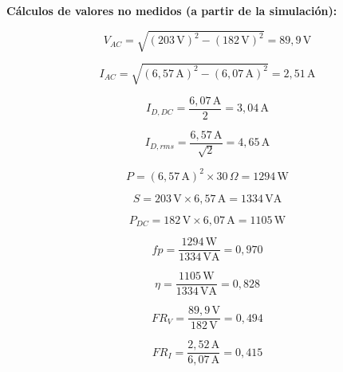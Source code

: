 \documentclass[12pt,a4paper]{article}
\begin{document}
\textbf{Cálculos de valores no medidos (a partir de la simulación):}

\begin{equation}
    V_{AC} = \sqrt{(203\,\text{V})^2 - (182\,\text{V})^2} = 89{,}9\,\text{V}
\end{equation}

\begin{equation}
    I_{AC} = \sqrt{(6{,}57\,\text{A})^2 - (6{,}07\,\text{A})^2} = 2{,}51\,\text{A}
\end{equation}

\begin{equation}
    I_{D,DC} = \frac{6{,}07\,\text{A}}{2} = 3{,}04\,\text{A}
\end{equation}

\begin{equation}
    I_{D,rms} = \frac{6{,}57\,\text{A}}{\sqrt{2}} = 4{,}65\,\text{A}
\end{equation}

\begin{equation}
    P = (6{,}57\,\text{A})^2 \times 30\,\Omega = 1294\,\text{W}
\end{equation}

\begin{equation}
    S = 203\,\text{V} \times 6{,}57\,\text{A} = 1334\,\text{VA}
\end{equation}

\begin{equation}
    P_{DC} = 182\,\text{V} \times 6{,}07\,\text{A} = 1105\,\text{W}
\end{equation}

\begin{equation}
    fp = \frac{1294\,\text{W}}{1334\,\text{VA}} = 0{,}970
\end{equation}

\begin{equation}
    \eta = \frac{1105\,\text{W}}{1334\,\text{VA}} = 0{,}828
\end{equation}

\begin{equation}
    FR_V = \frac{89{,}9\,\text{V}}{182\,\text{V}} = 0{,}494
\end{equation}

\begin{equation}
    FR_I = \frac{2{,}52\,\text{A}}{6{,}07\,\text{A}} = 0{,}415
\end{equation}
\end{document}
